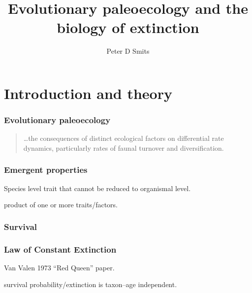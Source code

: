 \documentclass{beamer}
\title{Evolutionary paleoecology and the biology of extinction}
\author{Peter D Smits}
\institute{Committee on Evolutionary Biology, University of Chicago}
\begin{document}
\begin{frame}
  \maketitle
\end{frame}

\begin{frame}
  \tableofcontents
\end{frame}


\section{Introduction and theory}

\begin{frame}
  \frametitle{Evolutionary paleoecology}
  \begin{quotation}
    \dots the consequences of distinct ecological factors on differential rate dynamics, particularly rates of faunal turnover and diversification.

  \end{quotation}

\end{frame}

\begin{frame}
  \frametitle{Emergent properties}

  \begin{block}{\alert{Species level}}
    trait that cannot be reduced to organismal level. 
    
    product of one or more traits/factors.
  \end{block}
\end{frame}

\begin{frame}
  \frametitle{Survival}
\end{frame}

\begin{frame}
  \frametitle{Law of Constant Extinction}

  Van Valen 1973 ``Red Queen'' paper.

  \begin{block}{}
    survival probability/extinction is taxon--age independent.
  \end{block}

\end{frame}
\end{document}
